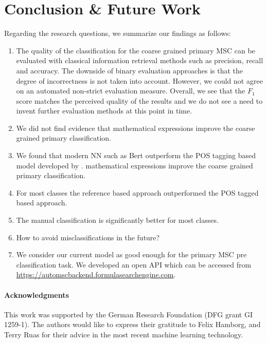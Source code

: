 \section{Conclusion \& Future Work}\label{sec.concl}
Regarding the research questions, we summarize our findings as follows:
\begin{enumerate}
  \item The quality of the classification for the coarse grained primary MSC can be evaluated with classical information retrieval methods such as precision, recall and accuracy. The downside of binary evaluation approaches is that the degree of incorrectness is not taken into account. However, we could not agree on an automated non-strict evaluation measure. Overall, we see that the $F_1$ score matches the perceived quality of the results and we do not see a need to invent further evaluation methods at this point in time.
  \item We did not find evidence that mathematical expressions improve the coarse grained primary classification.
  \item We found that modern NN such as Bert outperform the POS tagging based model developed by \cite{SchonebergS14}. mathematical expressions improve the coarse grained primary classification.
  \item For most classes the reference based approach outperformed the POS tagged based approach.
  \item The manual classification is significantly better for most classes. 
  \item How to avoid misclassifications in the future?
  \item We consider our current model as good enough for the primary MSC pre classification task. We developed an open API which can be accessed from \url{https://automscbackend.formulasearchengine.com}.
\end{enumerate}

\paragraph{Acknowledgments} This work was supported by the German Research Foundation (DFG grant GI 1259-1).
The authors would like to express their gratitude to Felix Hamborg, and Terry Ruas for their advice in the most recent machine learning technology.
\printbibliography[keyword=primary]